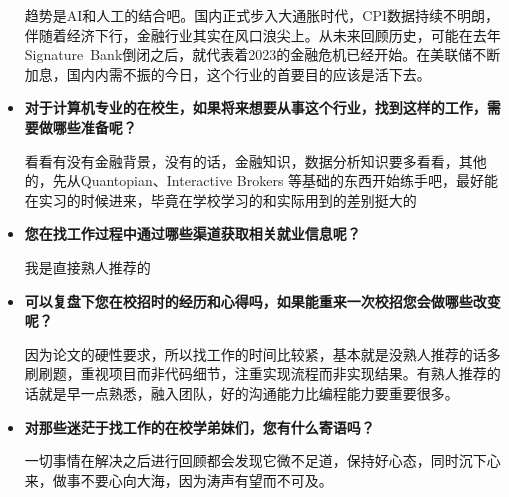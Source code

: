 \begin{itemize}
趋势是AI和人工的结合吧。国内正式步入大通胀时代，CPI数据持续不明朗，伴随着经济下行，金融行业其实在风口浪尖上。从未来回顾历史，可能在去年Signature Bank倒闭之后，就代表着2023的金融危机已经开始。在美联储不断加息，国内内需不振的今日，这个行业的首要目的应该是活下去。

    \item \textbf{对于计算机专业的在校生，如果将来想要从事这个行业，找到这样的工作，需要做哪些准备呢？}

看看有没有金融背景，没有的话，金融知识，数据分析知识要多看看，其他的，先从Quantopian、Interactive Brokers 等基础的东西开始练手吧，最好能在实习的时候进来，毕竟在学校学习的和实际用到的差别挺大的

    \item \textbf{您在找工作过程中通过哪些渠道获取相关就业信息呢？}

我是直接熟人推荐的

    \item \textbf{可以复盘下您在校招时的经历和心得吗，如果能重来一次校招您会做哪些改变呢？}

因为论文的硬性要求，所以找工作的时间比较紧，基本就是没熟人推荐的话多刷刷题，重视项目而非代码细节，注重实现流程而非实现结果。有熟人推荐的话就是早一点熟悉，融入团队，好的沟通能力比编程能力要重要很多。

    \item \textbf{对那些迷茫于找工作的在校学弟妹们，您有什么寄语吗？}

一切事情在解决之后进行回顾都会发现它微不足道，保持好心态，同时沉下心来，做事不要心向大海，因为涛声有望而不可及。

\end{itemize}